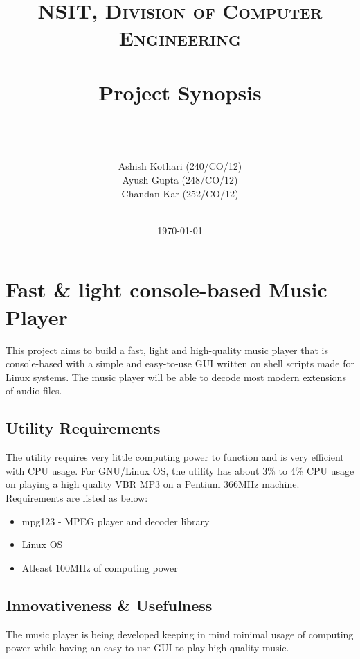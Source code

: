 \documentclass[paper=a4, fontsize=11pt]{scrartcl} %
\title{	
\normalfont \normalsize 
\textsc{NSIT, Division of Computer Engineering} \\ [25pt] %
\horrule{0.5pt} \\[0.4cm] %
\huge Project Synopsis \\ %
\horrule{2pt} \\[0.5cm] %
}
\author{
		\horrule{0.5pt} \\[0.4cm]
		Ashish Kothari (240/CO/12)\\
		Ayush Gupta (248/CO/12)\\
		Chandan Kar (252/CO/12)\\
		\horrule{0.5pt} \\[0.4cm]} %
\date{\normalsize\today} %
\numberwithin{equation}{section} %
\numberwithin{figure}{section} %
\numberwithin{table}{section} %
\begin{document}
\maketitle %


\section{Fast \& light console-based Music Player}

This project aims to build a fast, light and high-quality music player that is console-based with a simple and easy-to-use GUI written on shell scripts made for Linux systems. The music player will be able to decode most modern extensions of audio files.


\subsection{Utility Requirements}

The utility requires very little computing power to function and is very efficient with CPU usage. For GNU/Linux OS, the utility has about 3\% to 4\% CPU usage on playing a high quality VBR MP3 on a Pentium 366MHz machine.\\

Requirements are listed as below:
\begin{itemize}
	\item mpg123 - MPEG player and decoder library
	\item Linux OS
	\item Atleast 100MHz of computing power 
\end{itemize}



\subsection{Innovativeness \& Usefulness}

The music player is being developed keeping in mind minimal usage of computing power while having an easy-to-use GUI to play high quality music. \\
\end{document}
